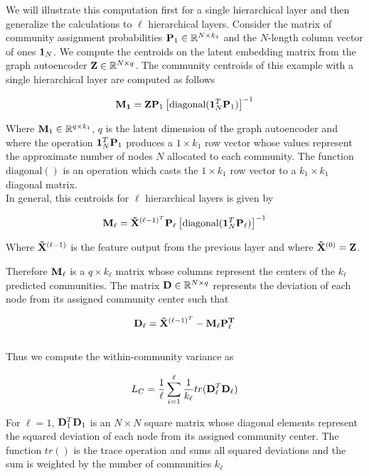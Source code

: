 \documentclass[a4paper,12pt]{article}
\begin{document}
\begin{itemize}
\begin{enumerate}
{{\begin{enumerate}
{					We will illustrate this computation first for a single hierarchical layer and then generalize the calculations to $\ell$ hierarchical layers. Consider the matrix of community assignment probabilities ${\bf P}_1\in \mathbb{R}^{N\times k_1}$ and the $N$-length column vector of ones ${\bf 1}_N$. We compute the centroids on the latent embedding matrix from the graph autoencoder ${\bf Z}\in \mathbb{R}^{N\times q}$. The community centroids of this example with a single hierarchical layer are computed as follows
					
					\[ {\bf M_1} = {\bf Z}{\bf P}_1 \left[\text{diagonal}({\bf 1}_N^T {\bf P}_1)\right]^{-1}\]
					
					Where ${\bf M}_1 \in \mathbb{R}^{q\times k_1}$, $q$ is the latent dimension of the graph autoencoder and where the operation ${\bf 1}_N^T {\bf P}_1$ produces a $1 \times k_1$ row vector whose values represent the approximate number of nodes $N$ allocated to each community. The function $\text{diagonal}()$ is an operation which casts the $1 \times k_1$ row vector to a $k_1 \times k_1$ diagonal matrix. \\
					
					In general, this centroids for $\ell$ hierarchical layers is given by
					
					\[ {\bf M_\ell} = {\bf \tilde X}^{(\ell-1)^T}{\bf P}_\ell \left[\text{diagonal}({\bf 1}_N^T {\bf P}_\ell)\right]^{-1}\]
					
					Where ${\bf \tilde X}^{(\ell-1)}$ is the feature output from the previous layer and where ${\bf \tilde X}^{(0)} = {\bf Z}$.
					
					Therefore $\bf M_\ell$ is a $q\times k_\ell$ matrix whose columns represent the centers of the $k_\ell$ predicted communities. The matrix ${\bf D}\in\mathbb{R}^{N\times q}$ represents the deviation of each node from its assigned community center such that
					
					\[ {\bf D}_\ell ={\bf \tilde X}^{(\ell-1)^T} - {\bf M}_\ell{\bf P_\ell^T} \]\\
					
					Thus we compute the within-community variance as 
					
					\[L_C = \frac{1}{\ell}\sum_{i=1}^\ell \frac{1}{k_\ell} tr({\bf D}_\ell^T {\bf D}_\ell)\]
					
					For $\ell = 1$, ${\bf D}_1^T {\bf D}_1$ is an $N\times N$ square matrix whose diagonal elements represent the squared deviation of each node from its assigned community center. The function $tr()$ is the trace operation and sums all squared deviations and the sum is weighted by the number of communities $k_\ell$ \\
					
}
\end{enumerate}}}
\end{enumerate}
\end{itemize}
\end{document}
